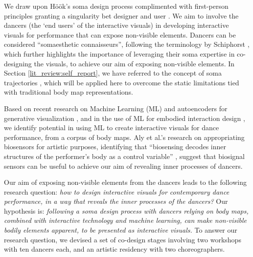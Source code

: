 We draw upon Höök's soma design process complimented with first-person principles granting a singularity bet designer and user \cite{hook_designing_2018}. We aim to involve the dancers (the ‘end users’ of the interactive visuals) in developing interactive visuals for performance that can expose non-visible elements. Dancers can be considered “somaesthetic connaisseurs”, following the terminology by Schiphorst \cite{schiphorst_self-evidence_2011}, which further highlights the importance of leveraging their soma expertise in co-designing the visuals, to achieve our aim of exposing non-visible elements. In Section \ref{lit_review:self_report}, we have referred to the concept of soma trajectories \cite{tennent_articulating_2021}, which will be applied here to overcome the static limitations tied with traditional body map representations.

Based on recent research on Machine Learning (ML) and autoencoders for generative visualization \cite{broad_autoencoding_2017, crnkovic-friis_generative_2016}, and in the use of ML for embodied interaction design \cite{plant_movement_2020}, we identify potential in using ML to create interactive visuals for dance performance, from a corpus of body maps. Aly et al.’s research on appropriating biosensors for artistic purposes, identifying that “biosensing decodes inner structures of the performer’s body as a control variable” \cite{aly_appropriating_2021}, suggest that biosignal sensors can be useful to achieve our aim of revealing inner processes of dancers.

Our aim of exposing non-visible elements from the dancers leads to the following research question: \textit{how to design interactive visuals for contemporary dance performance, in a way that reveals the inner processes of the dancers?} Our hypothesis is: \textit{following a soma design process with dancers relying on body maps, combined with interactive technology and machine learning, can make non-visible bodily elements apparent, to be presented as interactive visuals.} To answer our research question, we devised a set of co-design stages involving two workshops with ten dancers each, and an artistic residency with two choreographers.

